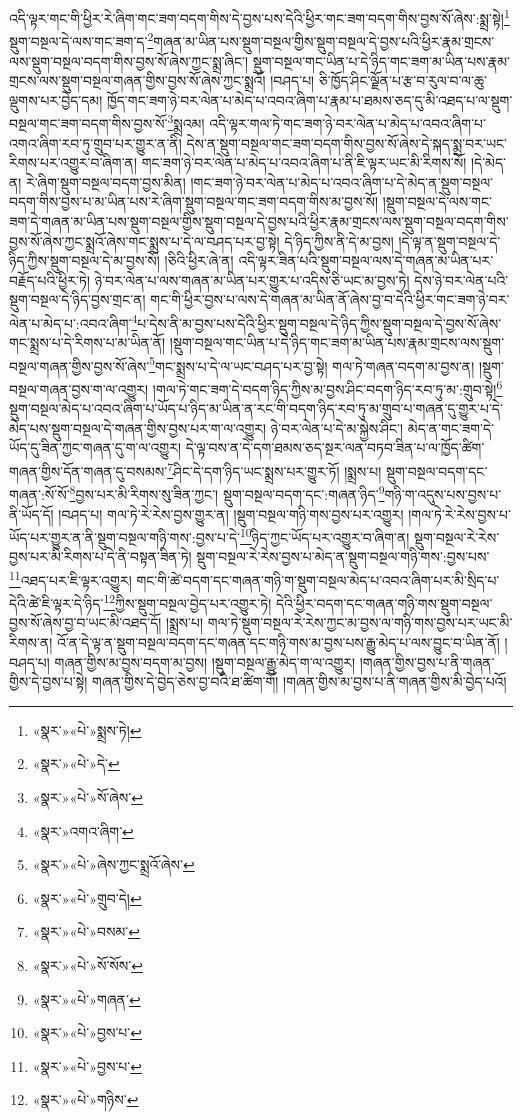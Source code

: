 འདི་ལྟར་གང་གི་ཕྱིར་རེ་ཞིག་གང་ཟག་བདག་གིས་དེ་བྱས་པས་དེའི་ཕྱིར་གང་ཟག་བདག་གིས་བྱས་སོ་ཞེས་:སྨྲ་སྟེ།\footnote{«སྣར་»«པེ་»སྨྲས་ཏེ།} སྡུག་བསྔལ་དེ་ལས་གང་ཟག་ད་\footnote{«སྣར་»«པེ་»དེ་}གཞན་མ་ཡིན་པས་སྡུག་བསྔལ་གྱིས་སྡུག་བསྔལ་དེ་བྱས་པའི་ཕྱིར་རྣམ་གྲངས་ལས་སྡུག་བསྔལ་བདག་གིས་བྱས་སོ་ཞེས་ཀྱང་སྨྲ་ཞིང་། སྡུག་བསྔལ་གང་ཡིན་པ་དེ་ཉིད་གང་ཟག་མ་ཡིན་པས་རྣམ་གྲངས་ལས་སྡུག་བསྔལ་གཞན་གྱིས་བྱས་སོ་ཞེས་ཀྱང་སྨྲའོ། །བཤད་པ། ཅི་ཁྱོད་ཤིང་ལྗོན་པ་རྩ་བ་རུལ་བ་ལ་ཆུ་ལྡུགས་པར་བྱེད་དམ། ཁྱོད་གང་ཟག་ཉེ་བར་ལེན་པ་མེད་པ་འབའ་ཞིག་པ་རྣམ་པ་ཐམས་ཅད་དུ་མི་འཐད་པ་ལ་སྡུག་བསྔལ་གང་ཟག་བདག་གིས་བྱས་སོ་\footnote{«སྣར་»«པེ་»སོ་ཞེས་}སྨྲའམ། འདི་ལྟར་གལ་ཏེ་གང་ཟག་ཉེ་བར་ལེན་པ་མེད་པ་འབའ་ཞིག་པ་འགའ་ཞིག་རབ་ཏུ་གྲུབ་པར་གྱུར་ན་ནི། དེས་ན་སྡུག་བསྔལ་གང་ཟག་བདག་གིས་བྱས་སོ་ཞེས་དེ་སྐད་སྨྲ་བར་ཡང་རིགས་པར་འགྱུར་བ་ཞིག་ན། གང་ཟག་ཉེ་བར་ལེན་པ་མེད་པ་འབའ་ཞིག་པ་ནི་ཇི་ལྟར་ཡང་མི་རིགས་སོ། །དེ་མེད་ན། རེ་ཞིག་སྡུག་བསྔལ་བདག་བྱས་མིན། །གང་ཟག་ཉེ་བར་ལེན་པ་མེད་པ་འབའ་ཞིག་པ་དེ་མེད་ན་སྡུག་བསྔལ་བདག་གིས་བྱས་པ་མ་ཡིན་པས་རེ་ཞིག་སྡུག་བསྔལ་གང་ཟག་བདག་གིས་མ་བྱས་སོ། །སྡུག་བསྔལ་དེ་ལས་གང་ཟག་དེ་གཞན་མ་ཡིན་པས་སྡུག་བསྔལ་གྱིས་སྡུག་བསྔལ་དེ་བྱས་པའི་ཕྱིར་རྣམ་གྲངས་ལས་སྡུག་བསྔལ་བདག་གིས་བྱས་སོ་ཞེས་ཀྱང་སྨྲའོ་ཞེས་གང་སྨྲས་པ་དེ་ལ་བཤད་པར་བྱ་སྟེ། དེ་ཉིད་ཀྱིས་ནི་དེ་མ་བྱས། །དེ་ལྟ་ན་སྡུག་བསྔལ་དེ་ཉིད་ཀྱིས་སྡུག་བསྔལ་དེ་མ་བྱས་སོ། །ཅིའི་ཕྱིར་ཞེ་ན། འདི་ལྟར་ཟིན་པའི་སྡུག་བསྔལ་ལས་དེ་གཞན་མ་ཡིན་པར་བརྗོད་པའི་ཕྱིར་ཏེ། ཉེ་བར་ལེན་པ་ལས་གཞན་མ་ཡིན་པར་གྱུར་པ་འདིས་ཅི་ཡང་མ་བྱས་ཏེ། དེས་ཉེ་བར་ལེན་པའི་སྡུག་བསྔལ་དེ་ཉིད་བྱས་གྲང་ན། གང་གི་ཕྱིར་བྱས་པ་ལས་དེ་གཞན་མ་ཡིན་ནོ་ཞེས་བྱ་བ་དེའི་ཕྱིར་གང་ཟག་ཉེ་བར་ལེན་པ་མེད་པ་:འབའ་ཞིག་\footnote{«སྣར་»འགའ་ཞིག་}པ་དེས་ནི་མ་བྱས་པས་དེའི་ཕྱིར་སྡུག་བསྔལ་དེ་ཉིད་ཀྱིས་སྡུག་བསྔལ་དེ་བྱས་སོ་ཞེས་གང་སྨྲས་པ་དེ་རིགས་པ་མ་ཡིན་ནོ། །སྡུག་བསྔལ་གང་ཡིན་པ་དེ་ཉིད་གང་ཟག་མ་ཡིན་པས་རྣམ་གྲངས་ལས་སྡུག་བསྔལ་གཞན་གྱིས་བྱས་སོ་ཞེས་\footnote{«སྣར་»«པེ་»ཞེས་ཀྱང་སྨྲའོ་ཞེས་}གང་སྨྲས་པ་དེ་ལ་ཡང་བཤད་པར་བྱ་སྟེ། གལ་ཏེ་གཞན་བདག་མ་བྱས་ན། །སྡུག་བསྔལ་གཞན་བྱས་ག་ལ་འགྱུར། །གལ་ཏེ་གང་ཟག་དེ་བདག་ཉིད་ཀྱིས་མ་བྱས་ཤིང་བདག་ཉིད་རབ་ཏུ་མ་:གྲུབ་སྟེ།\footnote{«སྣར་»«པེ་»གྲུབ་དེ།} སྡུག་བསྔལ་མེད་པ་འབའ་ཞིག་པ་ཡོད་པ་ཉིད་མ་ཡིན་ན་རང་གི་བདག་ཉིད་རབ་ཏུ་མ་གྲུབ་པ་གཞན་དུ་གྱུར་པ་དེ་མེད་པས་སྡུག་བསྔལ་དེ་གཞན་གྱིས་བྱས་པར་ག་ལ་འགྱུར། ཉེ་བར་ལེན་པ་དེ་མ་སྐྱེས་ཤིང་། མེད་ན་གང་ཟག་དེ་ཡོད་དུ་ཟིན་ཀྱང་གཞན་དུ་ག་ལ་འགྱུར། དེ་ལྟ་བས་ན་དེ་དག་ཐམས་ཅད་སྔར་ལན་བཏབ་ཟིན་པ་ལ་ཁྱོད་ཚིག་གཞན་གྱིས་དོན་གཞན་དུ་བསམས་\footnote{«སྣར་»«པེ་»བསམ་}ཤིང་དེ་དག་ཉིད་ཡང་སྨྲས་པར་གྱུར་ཏོ། །སྨྲས་པ། སྡུག་བསྔལ་བདག་དང་གཞན་:སོ་སོ་\footnote{«སྣར་»«པེ་»སོ་སོས་}བྱས་པར་མི་རིགས་སུ་ཟིན་ཀྱང་། སྡུག་བསྔལ་བདག་དང་:གཞན་ཉིད་\footnote{«སྣར་»«པེ་»གཞན་}གཉི་ག་འདུས་པས་བྱས་པ་ནི་ཡོད་དོ། །བཤད་པ། གལ་ཏེ་རེ་རེས་བྱས་གྱུར་ན། །སྡུག་བསྔལ་གཉི་གས་བྱས་པར་འགྱུར། །གལ་ཏེ་རེ་རེས་བྱས་པ་ཡོད་པར་གྱུར་ན་ནི་སྡུག་བསྔལ་གཉི་གས་:བྱས་པ་དེ་\footnote{«སྣར་»«པེ་»བྱས་པ་}ཉིད་ཀྱང་ཡོད་པར་འགྱུར་བ་ཞིག་ན། སྡུག་བསྔལ་རེ་རེས་བྱས་པར་མི་རིགས་པ་དེ་ནི་བསྟན་ཟིན་ཏེ། སྡུག་བསྔལ་རེ་རེས་བྱས་པ་མེད་ན་སྡུག་བསྔལ་གཉི་གས་:བྱས་པས་\footnote{«སྣར་»«པེ་»བྱས་པ་}འཐད་པར་ཇི་ལྟར་འགྱུར། གང་གི་ཚེ་བདག་དང་གཞན་གཉི་ག་སྡུག་བསྔལ་མེད་པ་འབའ་ཞིག་པར་མི་སྲིད་པ་དེའི་ཚེ་ཇི་ལྟར་དེ་ཉིད་\footnote{«སྣར་»«པེ་»གཉིས་}ཀྱིས་སྡུག་བསྔལ་བྱེད་པར་འགྱུར་ཏེ། དེའི་ཕྱིར་བདག་དང་གཞན་གཉི་གས་སྡུག་བསྔལ་བྱས་སོ་ཞེས་བྱ་བ་ཡང་མི་འཐད་དོ། །སྨྲས་པ། གལ་ཏེ་སྡུག་བསྔལ་རེ་རེས་ཀྱང་མ་བྱས་ལ་གཉི་གས་བྱས་པར་ཡང་མི་རིགས་ན། འོ་ན་དེ་ལྟ་ན་སྡུག་བསྔལ་བདག་དང་གཞན་དང་གཉི་གས་མ་བྱས་པས་རྒྱུ་མེད་པ་ལས་བྱུང་བ་ཡིན་ནོ། །བཤད་པ། གཞན་གྱིས་མ་བྱས་བདག་མ་བྱས། །སྡུག་བསྔལ་རྒྱུ་མེད་ག་ལ་འགྱུར། །གཞན་གྱིས་བྱས་པ་ནི་གཞན་གྱིས་དེ་བྱས་པ་སྟེ། གཞན་གྱིས་དེ་བྱེད་ཅེས་བྱ་བའི་ཐ་ཚིག་གོ། །གཞན་གྱིས་མ་བྱས་པ་ནི་གཞན་གྱིས་མི་བྱེད་པའོ། 